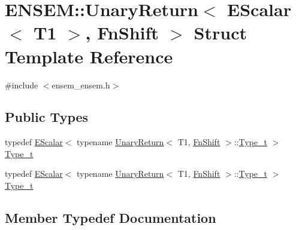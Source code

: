 \hypertarget{structENSEM_1_1UnaryReturn_3_01EScalar_3_01T1_01_4_00_01FnShift_01_4}{}\section{E\+N\+S\+EM\+:\+:Unary\+Return$<$ E\+Scalar$<$ T1 $>$, Fn\+Shift $>$ Struct Template Reference}
\label{structENSEM_1_1UnaryReturn_3_01EScalar_3_01T1_01_4_00_01FnShift_01_4}


{\ttfamily \#include $<$ensem\+\_\+ensem.\+h$>$}

\subsection*{Public Types}
\begin{DoxyCompactItemize}
\item 
typedef \mbox{\hyperlink{classENSEM_1_1EScalar}{E\+Scalar}}$<$ typename \mbox{\hyperlink{structENSEM_1_1UnaryReturn}{Unary\+Return}}$<$ T1, \mbox{\hyperlink{structENSEM_1_1FnShift}{Fn\+Shift}} $>$\+::\mbox{\hyperlink{structENSEM_1_1UnaryReturn_3_01EScalar_3_01T1_01_4_00_01FnShift_01_4_a36d8927b4e6f9ea44292d01926dc292a}{Type\+\_\+t}} $>$ \mbox{\hyperlink{structENSEM_1_1UnaryReturn_3_01EScalar_3_01T1_01_4_00_01FnShift_01_4_a36d8927b4e6f9ea44292d01926dc292a}{Type\+\_\+t}}
\item 
typedef \mbox{\hyperlink{classENSEM_1_1EScalar}{E\+Scalar}}$<$ typename \mbox{\hyperlink{structENSEM_1_1UnaryReturn}{Unary\+Return}}$<$ T1, \mbox{\hyperlink{structENSEM_1_1FnShift}{Fn\+Shift}} $>$\+::\mbox{\hyperlink{structENSEM_1_1UnaryReturn_3_01EScalar_3_01T1_01_4_00_01FnShift_01_4_a36d8927b4e6f9ea44292d01926dc292a}{Type\+\_\+t}} $>$ \mbox{\hyperlink{structENSEM_1_1UnaryReturn_3_01EScalar_3_01T1_01_4_00_01FnShift_01_4_a36d8927b4e6f9ea44292d01926dc292a}{Type\+\_\+t}}
\end{DoxyCompactItemize}


\subsection{Member Typedef Documentation}
\mbox{\label{structENSEM_1_1UnaryReturn_3_01EScalar_3_01T1_01_4_00_01FnShift_01_4_a36d8927b4e6f9ea44292d01926dc292a}} 
